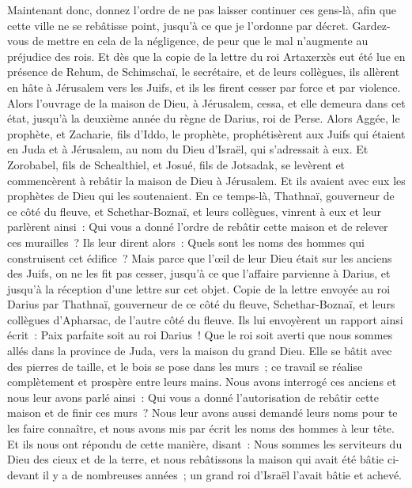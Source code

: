 \begin{multicols}{2}
Maintenant donc, donnez l'ordre de ne pas laisser continuer ces gens-là, afin que cette ville ne se rebâtisse point, jusqu'à ce que je l'ordonne par décret.
Gardez-vous de mettre en cela de la négligence, de peur que le mal n'augmente au préjudice des rois.
Et dès que la copie de la lettre du roi Artaxerxès eut été lue en présence de Rehum, de Schimschaï, le secrétaire, et de leurs collègues, ils allèrent en hâte à Jérusalem vers les Juifs, et ils les firent cesser par force et par violence.
Alors l'ouvrage de la maison de Dieu, à Jérusalem, cessa, et elle demeura dans cet état, jusqu'à la deuxième année du règne de Darius, roi de Perse.
\VerseOne{}Alors Aggée, le prophète, et Zacharie, fils d'Iddo, le prophète, prophétisèrent aux Juifs qui étaient en Juda et à Jérusalem, au nom du Dieu d'Israël, qui s'adressait à eux.
Et Zorobabel, fils de Schealthiel, et Josué, fils de Jotsadak, se levèrent et commencèrent à rebâtir la maison de Dieu à Jérusalem. Et ils avaient avec eux les prophètes de Dieu qui les soutenaient.
En ce temps-là, Thathnaï, gouverneur de ce côté du fleuve, et Schethar-Boznaï, et leurs collègues, vinrent à eux et leur parlèrent ainsi~: Qui vous a donné l'ordre de rebâtir cette maison et de relever ces murailles~?
Ils leur dirent alors~: Quels sont les noms des hommes qui construisent cet édifice~?
Mais parce que l'œil de leur Dieu était sur les anciens des Juifs, on ne les fit pas cesser, jusqu'à ce que l'affaire parvienne à Darius, et jusqu'à la réception d'une lettre sur cet objet.
Copie de la lettre envoyée au roi Darius par Thathnaï, gouverneur de ce côté du fleuve, Schethar-Boznaï, et leurs collègues d'Apharsac, de l'autre côté du fleuve.
Ils lui envoyèrent un rapport ainsi écrit~: Paix parfaite soit au roi Darius~!
Que le roi soit averti que nous sommes allés dans la province de Juda, vers la maison du grand Dieu. Elle se bâtit avec des pierres de taille, et le bois se pose dans les murs~; ce travail se réalise complètement et prospère entre leurs mains.
Nous avons interrogé ces anciens et nous leur avons parlé ainsi~: Qui vous a donné l'autorisation de rebâtir cette maison et de finir ces murs~?
Nous leur avons aussi demandé leurs noms pour te les faire connaître, et nous avons mis par écrit les noms des hommes à leur tête.
Et ils nous ont répondu de cette manière, disant~: Nous sommes les serviteurs du Dieu des cieux et de la terre, et nous rebâtissons la maison qui avait été bâtie ci-devant il y a de nombreuses années~; un grand roi d'Israël l'avait bâtie et achevé.

\end{multicols}
